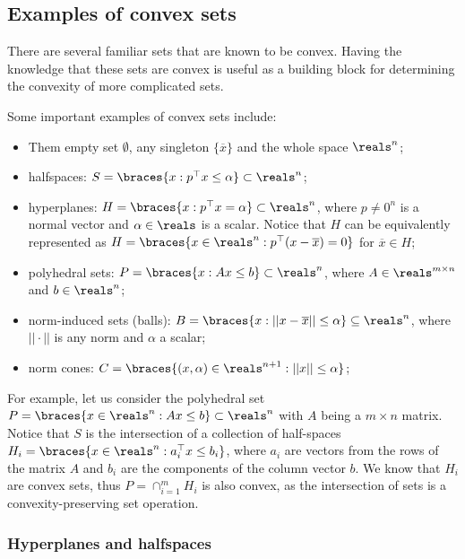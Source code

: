 \subsection{Examples of convex sets}

There are several familiar sets that are known to be convex. Having the knowledge that these sets are convex is useful as a building block for determining the convexity of more complicated sets.

Some important examples of convex sets include:
\begin{itemize}
	\item Them empty set $\emptyset$, any singleton $\{\overline{x}\}$ and the whole space $\reals^n$; 
	\item halfspaces: $S = \braces{x : p^\top x \leq \alpha} \subset \reals^n$;
	\item hyperplanes: $H = \braces{x : p^\top x = \alpha} \subset \reals^n$, where $p \neq 0^n$ is a normal vector and $\alpha\in \reals$ is a scalar. Notice that $H$ can be equivalently represented as $H = \braces{x \in \reals^n: p^\top(x - \overline{x}) = 0}$ for $\overline{x} \in H$;
	\item polyhedral sets: $P = \braces{x : Ax \leq b} \subset \reals^n$, where $A\in \reals^{m\times n}$ and $b \in \reals^n$;
	\item norm-induced sets (balls): $B = \braces{x : ||x - \overline{x}|| \leq \alpha} \subseteq \reals^n$, where $|| \cdot ||$ is any norm and $\alpha$ a scalar;
	\item norm cones: $C =\braces{(x,\alpha) \in \reals^{n+1}: ||x|| \leq \alpha} $;
\end{itemize} 

For example, let us consider the polyhedral set $P = \braces{x \in \reals^n : Ax \leq b} \subset \reals^n$ with $A$ being a $m \times n$ matrix. Notice that $S$ is the intersection of a collection of half-spaces $H_i = \braces{x \in \reals^n : a_i^\top x \leq b_i}$, where $a_i$ are vectors from the rows of the matrix $A$ and $b_i$ are the components of the column vector $b$. We know that $H_i$ are convex sets, thus $P = \cap_{i=1}^m H_i$ is also convex, as the intersection of sets is a convexity-preserving set operation.


\subsubsection{Hyperplanes and halfspaces}

